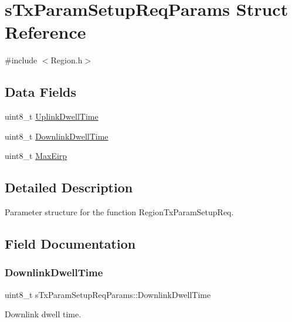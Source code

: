 \hypertarget{structsTxParamSetupReqParams}{}\section{s\+Tx\+Param\+Setup\+Req\+Params Struct Reference}
\label{structsTxParamSetupReqParams}


{\ttfamily \#include $<$Region.\+h$>$}

\subsection*{Data Fields}
\begin{DoxyCompactItemize}
\item 
uint8\+\_\+t \hyperlink{structsTxParamSetupReqParams_acf7e71d1e93e19932949aff6e507f085}{Uplink\+Dwell\+Time}
\item 
uint8\+\_\+t \hyperlink{structsTxParamSetupReqParams_a22e769f6c4a29a3fcaa71b6fd86bda30}{Downlink\+Dwell\+Time}
\item 
uint8\+\_\+t \hyperlink{structsTxParamSetupReqParams_aaa7d7db45232e9a208d1c94701a2c905}{Max\+Eirp}
\end{DoxyCompactItemize}


\subsection{Detailed Description}
Parameter structure for the function Region\+Tx\+Param\+Setup\+Req. 

\subsection{Field Documentation}
\mbox{\label{structsTxParamSetupReqParams_a22e769f6c4a29a3fcaa71b6fd86bda30}} 
\subsubsection{\texorpdfstring{Downlink\+Dwell\+Time}{DownlinkDwellTime}}
{\footnotesize\ttfamily uint8\+\_\+t s\+Tx\+Param\+Setup\+Req\+Params\+::\+Downlink\+Dwell\+Time}

Downlink dwell time. \mbox{\label{structsTxParamSetupReqParams_aaa7d7db45232e9a208d1c94701a2c905}} 
